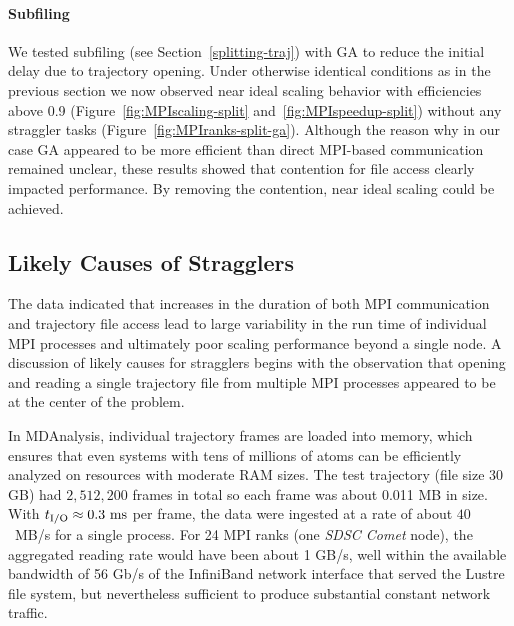 \paragraph{Subfiling}
We tested subfiling (see Section~\ref{splitting-traj}) with GA to reduce the initial delay due to trajectory opening.
Under otherwise identical conditions as in the previous section we now observed near ideal scaling behavior with efficiencies above 0.9 (Figure~\ref{fig:MPIscaling-split} and~\ref{fig:MPIspeedup-split}) without any straggler tasks (Figure~\ref{fig:MPIranks-split-ga}).
Although the reason why in our case GA appeared to be more efficient than direct MPI-based communication remained unclear, these results showed that contention for file access clearly impacted performance.
By removing the contention, near ideal scaling could be achieved.


\subsection{Likely Causes of Stragglers}
\label{sec:likelycauses}

The data indicated that increases in the duration of both MPI communication and trajectory file access lead to large variability in the run time of individual MPI processes and ultimately poor scaling performance beyond a single node.
A discussion of likely causes for stragglers begins with the observation that opening and reading a single trajectory file from multiple MPI processes appeared to be at the center of the problem. 

In MDAnalysis, individual trajectory frames are loaded into memory, which ensures that even systems with tens of millions of atoms can be efficiently analyzed on resources with moderate RAM sizes.
The test trajectory (file size 30 GB) had $2,512,200$ frames in total so each frame was about 0.011 MB in size.
With ${t}_{\text{I/O}} \approx 0.3~\text{ms}$ per frame, the data were ingested at a rate of about $40$~MB/s for a single process.
For 24 MPI ranks (one \emph{SDSC Comet} node), the aggregated reading rate would have been about 1 GB/s, well within the available bandwidth of 56 Gb/s of the InfiniBand network interface that served the Lustre file system, but nevertheless sufficient to produce substantial constant network traffic.

